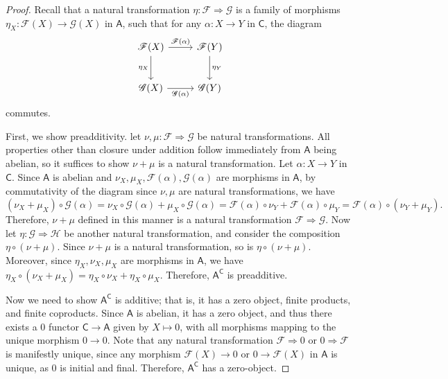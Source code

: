 \documentclass[11pt]{report}
\begin{document}
\begin{proof}
	Recall that a natural transformation $\eta : \mathscr{F}  \Rightarrow \mathscr{G} $ is a family of morphisms $\eta_X : \mathscr{F} (X) \to \mathscr{G} (X)$ in $\mathsf{A} $, such that for any $\alpha : X \to Y$ in $\mathsf{C} $, the diagram
	\[\begin{tikzcd}[row sep = 2.5em, column sep = 2.5em]
		\mathscr{F} (X)\arrow[r, "\mathscr{F} (\alpha )"]\arrow[d, "\eta _X"']&\mathscr{F} (Y)\arrow[d, "\eta_Y"]\\
		\mathscr{G} (X)\arrow[r, "\mathscr{G} (\alpha )"']&\mathscr{G} (Y)
	\end{tikzcd}\]
	commutes.

	First, we show preadditivity. let $\nu ,\mu : \mathscr{F}  \Rightarrow \mathscr{G} $ be natural transformations. All properties other than closure under addition follow immediately from $\mathsf{A} $ being abelian, so it suffices to show $\nu+\mu $ is a natural transformation. Let $\alpha : X \to Y$ in $\mathsf{C} $. Since $\mathsf{A} $ is abelian and $\nu_X,\mu _X,\mathscr{F} (\alpha ),\mathscr{G} (\alpha )$ are morphisms in $\mathsf{A} $, by commutativity of the diagram since $\nu ,\mu $ are natural transformations, we have
	\[
		\left( \nu _X+\mu _X \right) \circ \mathscr{G} (\alpha )=\nu _X\circ \mathscr{G} (\alpha )+\mu _X\circ \mathscr{G} (\alpha )=\mathscr{F} (\alpha )\circ \nu _Y+\mathscr{F} (\alpha )\circ \mu _Y=\mathscr{F} (\alpha )\circ \left( \nu _Y+\mu _Y \right) 
	.\]
	Therefore, $\nu +\mu $ defined in this manner is a natural transformation $ \mathscr{F}  \Rightarrow \mathscr{G} $. Now let $\eta : \mathscr{G}  \Rightarrow \mathscr{H} $ be another natural transformation, and consider the composition $\eta \circ (\nu +\mu )$. Since $\nu +\mu $ is a natural transformation, so is $\eta \circ (\nu +\mu )$. Moreover, since $\eta _X,\nu _X,\mu _X$ are morphisms in $\mathsf{A} $, we have $\eta _X\circ (\nu _X+\mu _X)=\eta _X\circ \nu _X+\eta _X\circ \mu _X$. Therefore, $\mathsf{A} ^{\mathsf{C} } $ is preadditive.

	Now we need to show $\mathsf{A} ^{\mathsf{C} } $ is additive; that is, it has a zero object, finite products, and finite coproducts. Since $\mathsf{A} $ is abelian, it has a zero object, and thus there exists a 0 functor $\mathsf{C} \to \mathsf{A} $ given by $X\mapsto 0$, with all morphisms mapping to the unique morphism $0\to 0$. Note that any natural transformation $ \mathscr{F}  \Rightarrow 0$ or $ 0 \Rightarrow \mathscr{F} $ is manifestly unique, since any morphism $\mathscr{F} (X)\to 0$ or $0\to \mathscr{F} (X)$ in $\mathsf{A} $ is unique, as $0$ is initial and final. Therefore, $\mathsf{A} ^{\mathsf{C} } $ has a zero-object.


\end{proof}
\end{document}
